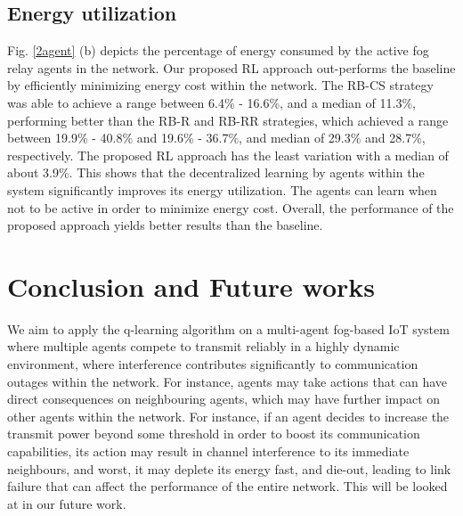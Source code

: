 \documentclass[journal]{IEEEtran}
\begin{document}
\subsection{Energy utilization}
Fig. \ref{2agent} (b) depicts the percentage of energy consumed by the active fog relay agents in the network. Our proposed RL approach out-performs the baseline by efficiently minimizing energy cost within the network. The RB-CS strategy was able to achieve a range between 6.4\% - 16.6\%, and a median of 11.3\%, performing better than the RB-R and RB-RR strategies, which achieved a range between 19.9\% - 40.8\% and 19.6\% - 36.7\%, and median of 29.3\% and 28.7\%, respectively. The proposed RL approach has the least variation with a median of about 3.9\%. This shows that the decentralized learning by agents within the system significantly improves its energy utilization. The agents can learn when not to be active in order to minimize energy cost. Overall, the performance of the proposed approach yields better results than the baseline.
%





\section{Conclusion and Future works}
We aim to apply the q-learning algorithm on a multi-agent fog-based IoT system where multiple agents compete to transmit reliably in a highly dynamic environment, where interference contributes significantly to communication outages within the network. For instance, agents may take actions that can have direct consequences on neighbouring agents, which may have further impact on other agents within the network. For instance, if an agent decides to increase the transmit power beyond some threshold in order to boost its communication capabilities, its action may result in channel interference to its immediate neighbours, and worst, it may deplete its energy fast, and die-out, leading to link failure that can affect the performance of the entire network. This will be looked at in our future work.
\end{document}
